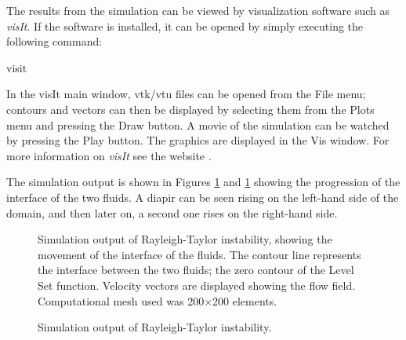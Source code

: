 %
%
The results from the simulation can be viewed by visualization software such as \textit{visIt}. If the software is installed, it can be opened by simply executing the following command:
%
\begin{python}
visit
\end{python}
%
In the visIt main window, vtk/vtu files can be opened from the File menu; contours and vectors can then be displayed by selecting them from the Plots menu and pressing the Draw button. A movie of the simulation can be watched by pressing the Play button. The graphics are displayed in the Vis window. For more information on \textit{visIt} see the website \cite{VisIt}.

The simulation output is shown in Figures \ref{RT2D OUTPUT1} and \ref{RT2D OUTPUT1} showing the progression of the interface of the two fluids. A diapir can be seen rising on the left-hand side of the domain, and then later on, a second one rises on the right-hand side.
\begin{figure}
\center
\subfigure[t=300]{\label{RT OUTPUT300}\texttt{[image: RT2D200by200t300]}}
\subfigure[t=600]{\label{RT OUTPUT600}\texttt{[image: RT2D200by200t600]}}
\subfigure[t=900]{\label{RT OUTPUT900}\texttt{[image: RT2D200by200t900]}}
\subfigure[t=1200]{\label{RT OUTPUT1200}\texttt{[image: RT2D200by200t1200]}}
\caption{Simulation output of Rayleigh-Taylor instability, showing the movement of the interface of the fluids. The contour line represents the interface between the two fluids; the zero contour of the Level Set function. Velocity vectors are displayed showing the flow field. Computational mesh used was 200$\times$200 elements.}
\label{RT2D OUTPUT1}
\end{figure}
%
\begin{figure}
\center
\subfigure[t=1500]{\label{RT OUTPUT1500}\texttt{[image: RT2D200by200t1500]}}
\subfigure[t=1800]{\label{RT OUTPUT1800}\texttt{[image: RT2D200by200t1800]}}
\caption{Simulation output of Rayleigh-Taylor instability.}
\label{RT2D OUTPUT2}
\end{figure}
%
%
%
